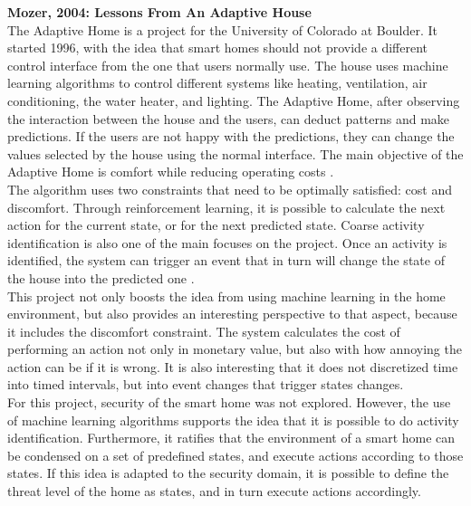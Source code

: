 \textbf{Mozer, 2004: Lessons From An Adaptive House} \cite{mozer2004lessons} \\
The Adaptive Home is a project for the University of Colorado at Boulder. It started 1996, with the idea that smart homes should not provide a different control interface from the one that users normally use. The house uses machine learning algorithms to control different systems like heating, ventilation, air conditioning, the water heater, and lighting. The Adaptive Home, after observing the interaction between the house and the users, can deduct patterns and make predictions. If the users are not happy with the predictions, they can change the values selected by the house using the normal interface. The main objective of the Adaptive Home is comfort while reducing operating costs \cite{mozer2004lessons}.\\
The algorithm uses two constraints that need to be optimally satisfied: cost and discomfort. Through reinforcement learning, it is possible to calculate the next action for the current state, or for the next predicted state. Coarse activity identification is also one of the main focuses on the project. Once an activity is identified, the system can trigger an event that in turn will change the state of the house into the predicted one \cite{mozer2004lessons}.\\
This project not only boosts the idea from using machine learning in the home environment, but also provides an interesting perspective to that aspect, because it includes the discomfort constraint. The system calculates the cost of performing an action not only in monetary value, but also with how annoying the action can be if it is wrong. It is also interesting that it does not discretized time into timed intervals, but into event changes that trigger states changes.\\
For this project, security of the smart home was not explored. However, the use of machine learning algorithms supports the idea that it is possible to do activity identification. Furthermore, it ratifies that the environment of a smart home can be condensed on a set of predefined states, and execute actions according to those states.  If this idea is adapted to the security domain, it is possible to define the threat level of the home as states, and in turn execute actions accordingly.\\



